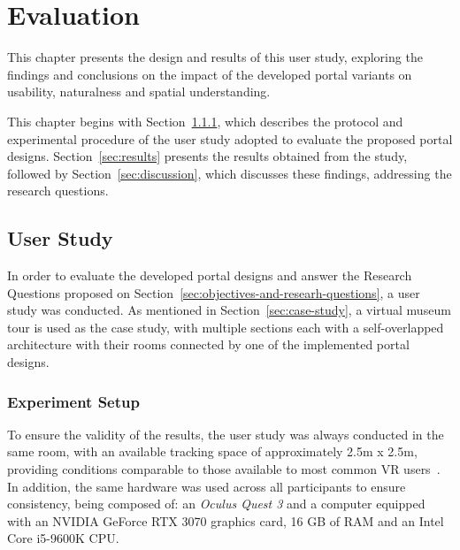 
%

\chapter{Evaluation}
\label{cha:evaluation}
This chapter presents the design and results of this user study, exploring the findings and conclusions on 
the impact of the developed portal variants on usability, naturalness and spatial understanding.

This chapter begins with Section~\ref{sec:protocol}, which describes the protocol and experimental procedure of the user study 
adopted to evaluate the proposed portal designs. 
Section~\ref{sec:results} presents the results obtained from the study, followed by Section~\ref{sec:discussion}, 
which discusses these findings, addressing the research questions.

\section{User Study}

In order to evaluate the developed portal designs and answer the Research Questions proposed on Section~\ref{sec:objectives-and-researh-questions},
a user study was conducted. 
As mentioned in Section~\ref{sec:case-study}, a virtual museum tour is used as the case study, with multiple sections each with a 
self-overlapped architecture with their rooms connected by one of the implemented portal designs.

\subsection{Experiment Setup}
\label{sec:protocol}

To ensure the validity of the results, the user study was always conducted in the same room, with an available tracking space of 
approximately 2.5m x 2.5m, providing conditions comparable to those available to most common \gls{VR} users~\cite{Azmandian2015, Liu2018b}. In addition, 
the same hardware was used across all participants to ensure consistency, being composed of: an \textit{Oculus Quest 3}  and 
a computer equipped with an NVIDIA GeForce RTX 3070 graphics card, 16 GB of RAM and an Intel Core i5-9600K CPU.

